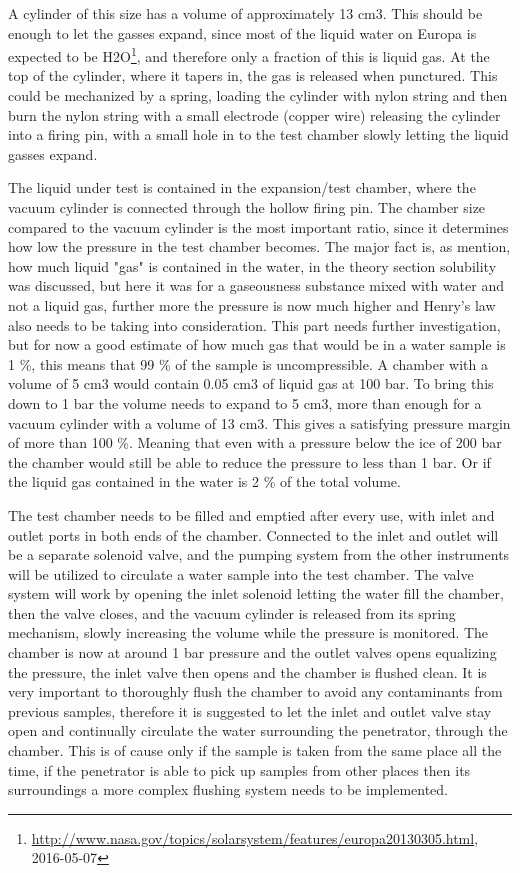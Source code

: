 A cylinder of this size has a volume of approximately 13 cm3. This should be enough to let the gasses expand, since most of the liquid water on Europa is expected to be H2O\footnote{\url{http://www.nasa.gov/topics/solarsystem/features/europa20130305.html}, 2016-05-07}, and therefore only a fraction of this is liquid gas. At the top of the cylinder, where it tapers in, the gas is released when punctured. This could be mechanized by a spring, loading the cylinder with nylon string and then burn the nylon string with a small electrode (copper wire) releasing the cylinder into a firing pin, with a small hole in to the test chamber slowly letting the liquid gasses expand.

The liquid under test is contained in the expansion/test chamber, where the vacuum cylinder is connected through the hollow firing pin. The chamber size compared to the vacuum cylinder is the most important ratio, since it determines how low the pressure in the test chamber becomes. The major fact is, as mention, how much liquid "gas" is contained in the water, in the theory section solubility was discussed, but here it was for a gaseousness substance mixed with water and not a liquid gas, further more the pressure is now much higher and Henry's law also needs to be taking into consideration. This part needs further investigation, but for now a good estimate of how much gas that would be in a water sample is 1 \%, this means that 99 \% of the sample is uncompressible. A chamber with a volume of 5 cm3 would contain 0.05 cm3 of liquid gas at 100 bar. To bring this down to 1 bar the volume needs to expand to 5 cm3, more than enough for a vacuum cylinder with a volume of 13 cm3. This gives a satisfying pressure margin of more than 100 \%. Meaning that even with a pressure below the ice of 200 bar the chamber would still be able to reduce the pressure to less than 1 bar. Or if the liquid gas contained in the water is 2 \% of the total volume.

The test chamber needs to be filled and emptied after every use, with inlet and outlet ports in both ends of the chamber. Connected to the inlet and outlet will be a separate solenoid valve, and the pumping system from the other instruments will be utilized to circulate a water sample into the test chamber. The valve system will work by opening the inlet solenoid letting the water fill the chamber, then the valve closes, and the vacuum cylinder is released from its spring mechanism, slowly increasing the volume while the pressure is monitored. The chamber is now at around 1 bar pressure and the outlet valves opens equalizing the pressure, the inlet valve then opens and the chamber is flushed clean. It is very important to thoroughly flush the chamber to avoid any contaminants from previous samples, therefore it is suggested to let the inlet and outlet valve stay open and continually circulate the water surrounding the penetrator, through the chamber. This is of cause only if the sample is taken from the same place all the time, if the penetrator is able to pick up samples from other places then its surroundings a more complex flushing system needs to be implemented.

